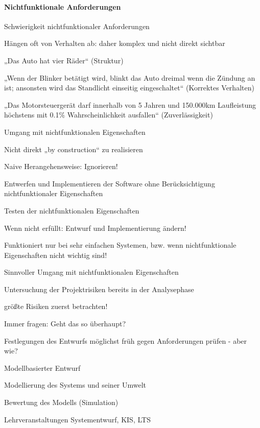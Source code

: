 \documentclass[a4paper]{article}
\begin{document}
\begin{multicols}{3}
  \paragraph{Nichtfunktionale Anforderungen}
  Schwierigkeit nichtfunktionaler Anforderungen
  \begin{itemize*}
    \item Hängen oft von Verhalten ab: daher komplex und nicht direkt sichtbar
    \item „Das Auto hat vier Räder“ (Struktur)
    \item „Wenn der Blinker betätigt wird, blinkt das Auto dreimal wenn die Zündung an ist; ansonsten wird das Standlicht einseitig eingeschaltet“ (Korrektes Verhalten)
    \item „Das Motorsteuergerät darf innerhalb von 5 Jahren und 150.000km Laufleistung höchstens mit 0.1\% Wahrscheinlichkeit ausfallen“ (Zuverlässigkeit)
  \end{itemize*}

  Umgang mit nichtfunktionalen Eigenschaften
  \begin{itemize*}
    \item Nicht direkt „by construction“ zu realisieren
    \item Naive Herangehensweise: Ignorieren!
          \begin{itemize*}
            \item Entwerfen und Implementieren der Software ohne Berücksichtigung nichtfunktionaler Eigenschaften
            \item Testen der nichtfunktionalen Eigenschaften
            \item Wenn nicht erfüllt: Entwurf und Implementierung ändern!
          \end{itemize*}
    \item Funktioniert nur bei sehr einfachen Systemen, bzw. wenn nichtfunktionale Eigenschaften nicht wichtig sind!
  \end{itemize*}

  Sinnvoller Umgang mit nichtfunktionalen Eigenschaften
  \begin{itemize*}
    \item Untersuchung der Projektrisiken bereits in der Analysephase
          \begin{itemize*}
            \item größte Risiken zuerst betrachten!
            \item Immer fragen: Geht das so überhaupt?
            \item Festlegungen des Entwurfs möglichst früh gegen Anforderungen prüfen - aber wie?
          \end{itemize*}
    \item Modellbasierter Entwurf
          \begin{itemize*}
            \item Modellierung des Systems und seiner Umwelt
            \item Bewertung des Modells (Simulation)
            \item Lehrveranstaltungen Systementwurf, KIS, LTS
          \end{itemize*}
  \end{itemize*}


\end{multicols}
\end{document}
